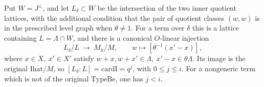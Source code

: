 \begin{lemma}
\label{lem:flag-defect-image}
Put \(W=J^\perp\), and let \(L_\delta\subset W\) be the
intersection of the two inner quotient lattices, with the additional
condition that the pair of quotient classes \((w,w)\) is in the
prescribed level graph when \(\theta\ne1\).
For a term over \(\delta\) this is a lattice containing
\(L=\Lambda\cap W\), and there is a canonical \(O\)-linear injection
\[
 L_\delta/L\ \longrightarrow\ M_h/M,\qquad
 w\longmapsto [\theta^{-1}(x'-x)],
 \tag{DS1}
\]
where \(x\in X,\ x'\in X'\) satisfy
\(w+x,w+x'\in\Lambda,\ x'-x\in\theta\Lambda\).
Its image is the original \(\mathrm{Ihat}/M\), so
\([L_\delta:L]=\mathrm{cardI}=q^j\), with \(0\le j\le i\).
For a nongeneric term which is not of the original
\(\mathrm{TypeBe}\), one has \(j<i\).
\end{lemma}
